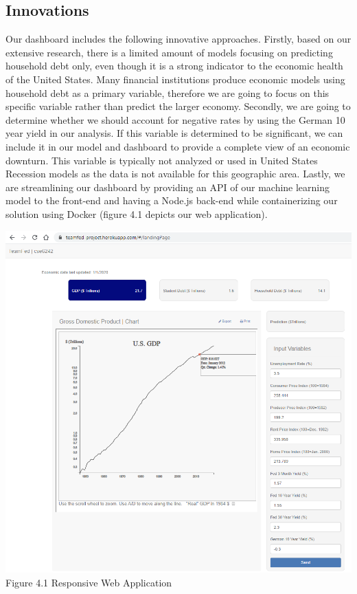 \documentclass[sigconf,nonacm,11pt]{acmart}
\begin{document}





\subsection{Innovations}

Our dashboard includes the following innovative approaches. Firstly, based on our extensive research, there is a limited amount of models focusing on predicting household debt only, even though it is a strong indicator to the economic health of the United States. Many financial institutions produce economic models using household debt as a primary variable, therefore we are going to focus on this specific variable rather than predict the larger economy. Secondly, we are going to determine whether we should account for negative rates by using the German 10 year yield in our analysis. If this variable is determined to be significant, we can include it in our model and dashboard to provide a complete view of an economic downturn. This variable is typically not analyzed or used in United States Recession models as the data is not available for this geographic area.  Lastly, we are streamlining our dashboard by providing an API of our machine learning model to the front-end and having a Node.js back-end while containerizing our solution using Docker (figure 4.1 depicts our web application).\vspace{0.5em}


\includegraphics[scale = 0.32]{dashboard.png}
Figure 4.1 Responsive Web Application
\vspace{0.5em}
\end{document}
